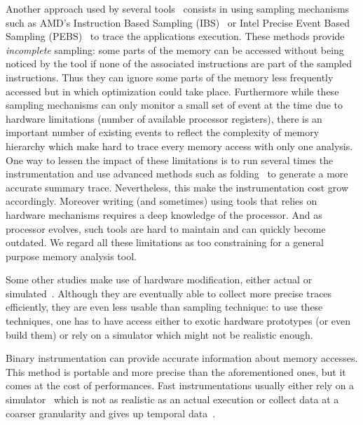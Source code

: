 Another approach used by several
tools~\cite{Lachaize12MemProf,McCurdy10Memphis,Liu14Tool,Gimenez14Dissecting}
consists in using sampling mechanisms such as AMD's Instruction Based Sampling
(IBS)~\cite{Drongowski07Instructionbased} or Intel Precise Event Based
Sampling (PEBS)~\cite{Levinthal2009} to trace the applications execution. These methods
provide \emph{incomplete} sampling: some parts of the memory can be accessed without
being noticed by the tool if none of the associated instructions are part of the sampled
instructions.
Thus they can ignore some parts of the memory less frequently accessed but in which
optimization could take place.
Furthermore while these sampling mechanisms can only monitor a small set of event
at the time due to hardware limitations (number of available processor
registers), there is an important number of existing events to reflect the
complexity of memory hierarchy which make hard to trace every memory
access with only one analysis.
One way to lessen the impact of these limitations is to run several times the
instrumentation and use advanced methods such as
folding~\cite{Servat15Towards} to generate a more accurate summary trace.
Nevertheless, this make the instrumentation cost grow accordingly.
Moreover writing (and sometimes) using tools that relies on hardware mechanisms
requires a deep knowledge of the processor. And as processor evolves,
such tools are hard to maintain and can quickly become outdated.
We regard all these limitations as too constraining for a general purpose
memory analysis tool.

Some other studies make use of hardware modification, either actual or
simulated~\cite{Bao08HMTT,Martonosi92MemSpy}.  Although they are eventually able to collect
more precise traces efficiently, they are even less usable than sampling technique: to use
these techniques, one has to have access either to exotic hardware prototypes
(or even build them) or rely on a simulator which might not be realistic
enough.

Binary instrumentation can provide accurate information about memory accesses.
This method is portable and  more precise than the aforementioned ones,
but it comes at the cost of performances. Fast
instrumentations usually either rely on a simulator~\cite{DeRose02SIGMA} which is not as realistic as an actual execution
or collect data at a coarser granularity and gives up temporal
data~\cite{Beniamine15TABARNAC}.


